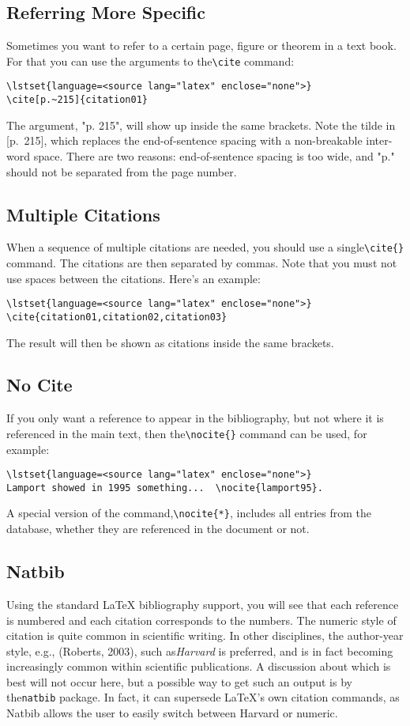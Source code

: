 \subsection{Referring More Specific}
Sometimes you want to refer to a certain page, figure or theorem in a text
book. For that you can use the arguments to the\verb|\cite| command:
\begin{lstlisting}
\lstset{language=<source lang="latex" enclose="none">}
\cite[p.~215]{citation01}
\end{lstlisting}
The argument, "p. 215", will show up inside the same brackets. Note the tilde
in [p.~215], which replaces the end-of-sentence spacing with a non-breakable
inter-word space. There are two reasons: end-of-sentence spacing is too wide,
and "p." should not be separated from the page number.

\subsection{Multiple Citations}
When a sequence of multiple citations are needed, you should use a
single\verb|\cite{}| command. The citations are then separated by commas. Note
that you must not use spaces between the citations. Here's an example: 

\begin{lstlisting}
\lstset{language=<source lang="latex" enclose="none">}
\cite{citation01,citation02,citation03}
\end{lstlisting}
The result will then be shown as citations inside the same brackets.

\subsection{No Cite}
If you only want a reference to appear in the bibliography, but not where it is
referenced in the main text, then the\verb|\nocite{}| command can be used, for
example:
\begin{lstlisting}
\lstset{language=<source lang="latex" enclose="none">}
Lamport showed in 1995 something...  \nocite{lamport95}.
\end{lstlisting}

A special version of the command,\verb|\nocite{*}|, includes all entries from
the database, whether they are referenced in the document or not.

\subsection{Natbib}
Using the standard LaTeX bibliography support, you will see that each reference
is numbered and each citation corresponds to the numbers. The numeric style of
citation is quite common in scientific writing. In other disciplines, the
author-year style, e.g., (Roberts, 2003), such as\textit{Harvard} is preferred,
and is in fact becoming increasingly common within scientific publications. A
discussion about which is best will not occur here, but a possible way to get
such an output is by the\verb|natbib| package. In fact, it can supersede
LaTeX's own citation commands, as Natbib allows the user to easily switch
between Harvard or numeric.

